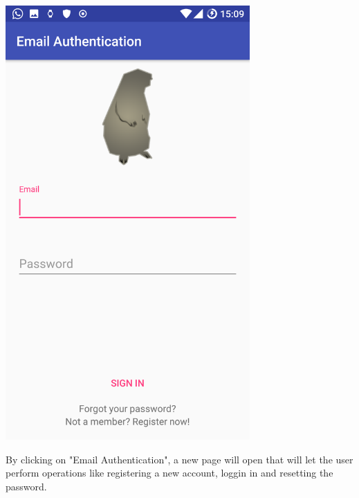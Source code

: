 \documentclass[a4paper]{scrreprt}
\begin{document}
\begin{minipage}{0.5\textwidth}
	\centering
	\includegraphics[width=0.7\textwidth]{authentication_email}
\end{minipage}
\begin{minipage}{0.5\textwidth}
	By clicking on "Email Authentication", a new page will open that will let the user perform operations like registering a new account, loggin in and resetting the password. 
\end{minipage}
\end{document}
